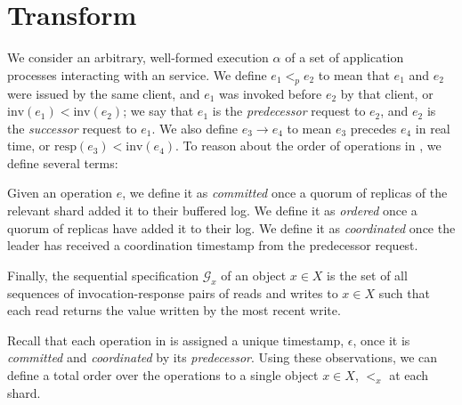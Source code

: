 \section{Transform}

We consider an arbitrary, well-formed execution $\alpha$ of a set of application processes interacting with an \sys{} service. We define $e_1 <_p e_2$ to mean that $e_1$ and $e_2$ were issued by the same client, and $e_1$ was invoked before $e_2$ by that client, or $\text{inv}(e_1) < \text{inv}(e_2)$; we say that $e_1$ is the \textit{predecessor} request to $e_2$, and $e_2$ is the \textit{successor} request to $e_1$. We also define $e_3 \rightarrow e_4$ to mean $e_3$ precedes $e_4$ in real time, or $\text{resp}(e_3) < \text{inv}(e_4)$. To reason about the order of operations in \sys{}, we define several terms:

Given an operation $e$, we define it as \textit{committed} once a quorum of replicas of the relevant shard added it to their buffered log. We define it as \textit{ordered} once a quorum of replicas have added it to their log. We define it as \textit{coordinated} once the leader has received a coordination timestamp from the predecessor request.

Finally, the sequential specification $\mathcal{G}_x$ of an object $x \in X$ is the set of all sequences of invocation-response pairs of reads and writes to $x \in X$ such that each read returns the value written by the most recent write.

Recall that each operation in \sys{} is assigned a unique timestamp, $\epsilon$, once it is \textit{committed} and \textit{coordinated} by its \textit{predecessor}. Using these observations, we can define a total order over the operations to a single object $x \in X$, $<_x$ at each shard.

